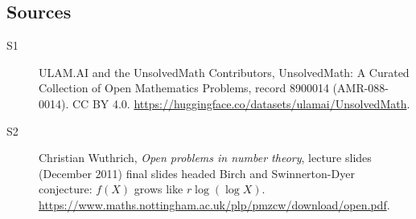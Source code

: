 \documentclass[11pt]{article}
\begin{document}
\subsection{Sources}
\begin{description}
\item[\hypertarget{source:8900014:1}{S1}] ULAM.AI and the UnsolvedMath Contributors, UnsolvedMath: A Curated Collection of Open Mathematics Problems, record 8900014 (AMR-088-0014). CC BY 4.0. \url{https://huggingface.co/datasets/ulamai/UnsolvedMath}.
\item[\hypertarget{source:8900014:2}{S2}] Christian Wuthrich, \emph{Open problems in number theory}, lecture slides (December 2011) final slides headed Birch and Swinnerton-Dyer conjecture: $f(X)$ grows like $r\log(\log X)$. \url{https://www.maths.nottingham.ac.uk/plp/pmzcw/download/open.pdf}.
\end{description}
\label{end:8900014}
\end{document}
